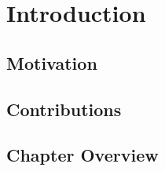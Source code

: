 \chapter{Introduction}
\label{chap:introduction}
\section{Motivation}
 \protect\cite{Kimathi2020}

\section{Contributions}
\section{Chapter Overview}
